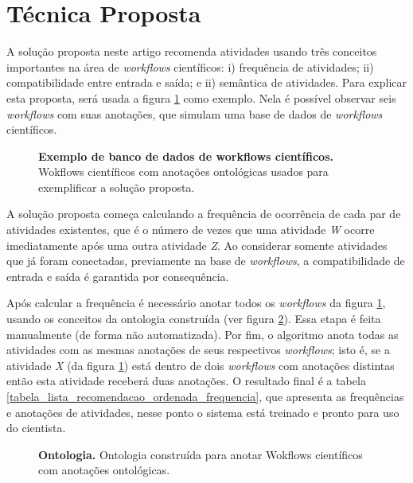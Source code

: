 \documentclass[10pt,letterpaper]{article}
\begin{document}
\section*{Técnica Proposta}
A solução proposta neste artigo recomenda atividades usando três conceitos importantes na área de \emph{workflows} científicos: i) frequência de atividades; ii) compatibilidade entre entrada e saída; e ii) semântica de atividades. Para explicar esta proposta, será usada a figura \ref{FIGURA_ONTOLOGIA_CONSTRUIDA2} como exemplo. Nela é possível observar seis \emph{workflows} com suas anotações, que simulam uma base de dados de \emph{workflows} científicos.
\begin{figure}[!h]
	\caption{{\bf Exemplo de banco de dados de workflows científicos.}
		Wokflows científicos com anotações ontológicas usados para exemplificar a solução proposta.}
	\label{FIGURA_ONTOLOGIA_CONSTRUIDA2}
\end{figure}

A solução proposta começa calculando a frequência de ocorrência de cada par de atividades existentes, que é o número de vezes que uma atividade \emph{W} ocorre imediatamente após uma outra atividade \emph{Z}. Ao considerar somente atividades que já foram conectadas, previamente na base de \emph{workflows}, a compatibilidade de entrada e saída é garantida por consequência.

Após calcular a frequência é necessário anotar todos os \emph{workflows} da figura \ref{FIGURA_ONTOLOGIA_CONSTRUIDA2}, usando os conceitos da ontologia construída (ver figura \ref{FIGURA_ONTOLOGIA_CONSTRUIDA}). Essa etapa é feita manualmente (de forma não automatizada). Por fim, o algoritmo anota todas as atividades com as mesmas anotações de seus respectivos \emph{workflows}; isto é, se a atividade \emph{X} (da figura \ref{FIGURA_ONTOLOGIA_CONSTRUIDA2}) está dentro de dois \emph{workflows} com anotações distintas então esta atividade receberá duas anotações. O resultado final é a tabela \ref{tabela_lista_recomendacao_ordenada_frequencia}, que apresenta as frequências e anotações de atividades, nesse ponto o sistema está treinado e pronto para uso do cientista.
\begin{figure}[!h]
	\caption{{\bf Ontologia.}
		Ontologia construída para anotar Wokflows científicos com anotações ontológicas.}
	\label{FIGURA_ONTOLOGIA_CONSTRUIDA}
\end{figure}
\end{document}
